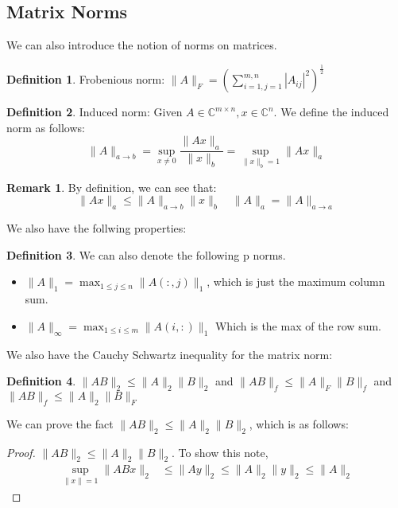 \documentclass[11pt]{article}
\theoremstyle{definition}
\newtheorem{definition}{Definition}[section]
\newtheorem{remark}{Remark}[section]
\newcommand{\C}{\mathbb{C}}
\begin{document}
\subsection{Matrix Norms}
We can also introduce the notion of norms on matrices. 
\begin{definition}
  Frobenious norm: $\|A \|_F = \left( \sum_{i = 1, j = 1}^{m, n} |A_{ij}|^2 \right)^\frac{1}{2}$
\end{definition}
\begin{definition}
  Induced norm: Given $A \in \C^{m \times n }, x \in \C^n$. We define the induced norm as follows:
  \[
  \|A \|_{a \to b} = \sup_{x \neq 0} \frac{\|Ax\|_a}{\|x\|_b} = \sup_{\|x\|_b = 1} \|Ax \|_a
  \]
\end{definition}
\begin{remark}
  By definition, we can see that: 
  \[
  \|Ax \|_a \leq \|A\|_{a \to b} \|x\|_b \quad \|A\|_a = \|A\|_{a \to a}
  \]
\end{remark}
We also have the follwing properties:
\begin{definition}
  We can also denote the following p norms. 
  \begin{itemize}
    \item $\|A\|_1 = \max_{1 \leq j \leq n} \| A(:,j)\|_1$, which is just the maximum column sum.
    \item $\|A\|_\infty = \max_{1 \leq i \leq m} \|A(i, :)\|_1$  Which is the max of the row sum. 
  \end{itemize}
\end{definition}
We also have the Cauchy Schwartz inequality for the matrix norm:
\begin{definition}
  $\|AB\|_2 \leq \|A\|_2 \|B\|_2$ and $\|AB\|_f \leq \|A\|_F\|B\|_f$ and $\|AB\|_f \leq \|A\|_2 \|B\|_F$
\end{definition}
We can prove the fact $\|AB\|_2 \leq \|A\|_2 \|B\|_2$, which is as follows:
\begin{proof}
  $\|AB\|_2 \leq \|A\|_2 \|B\|_2$. To show this note, 
  \begin{align*}
    \sup_{\|x \| = 1} \|ABx\|_2 & \leq \|Ay\|_2 \leq \| A\|_2 \|y\|_2 \leq \|A\|_2 
  \end{align*}
\end{proof}
\end{document}

